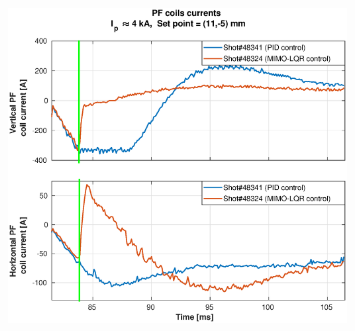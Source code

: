 \begin{figure}
	\centering
	\includegraphics[width=0.8\textwidth]{Chp5/PIDvsMIMO_341_324_curr_2.eps}
	\label{341_342_curr}
\end{figure}



